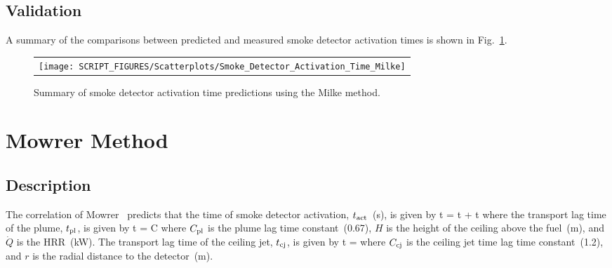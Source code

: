 

\clearpage


\subsection*{Validation}

A summary of the comparisons between predicted and measured smoke detector activation times is shown in Fig.~\ref{Smoke_Detector_Activation_Summary_Milke}.

\begin{figure}[!ht]
\begin{center}
\begin{tabular}{l}
\texttt{[image: SCRIPT\_FIGURES/Scatterplots/Smoke\_Detector\_Activation\_Time\_Milke]}
\end{tabular}
\end{center}
\caption[Summary of smoke detector activation time predictions (Milke)]
{Summary of smoke detector activation time predictions using the Milke method.}
\label{Smoke_Detector_Activation_Summary_Milke}
\end{figure}


\clearpage


\section{Mowrer Method}
\label{sec:Mowrer}

\subsection*{Description}

The correlation of Mowrer~\cite{Mowrer:1} predicts that the time of smoke detector activation, $t\sb{act}$~(\si{s}), is given by
\be
t = t + t
\label{eq:Mowrer}
\ee
where the transport lag time of the plume, $t\sb{pl}$, is given by
\be
t = C 
\label{eq:Mowrer_tpl}
\ee
where $C\sb{pl}$ is the plume lag time constant~(0.67), $H$ is the height of the ceiling above the fuel~(\si{m}), and $\dot Q$ is the HRR~(\si{kW}).
The transport lag time of the ceiling jet, $t\sb{cj}$, is given by
\be
t =  
\label{eq:Mowrer_tcj}
\ee
where $C\sb{cj}$ is the ceiling jet time lag time constant~(1.2), and $r$ is the radial distance to the detector~(\si{m}).

